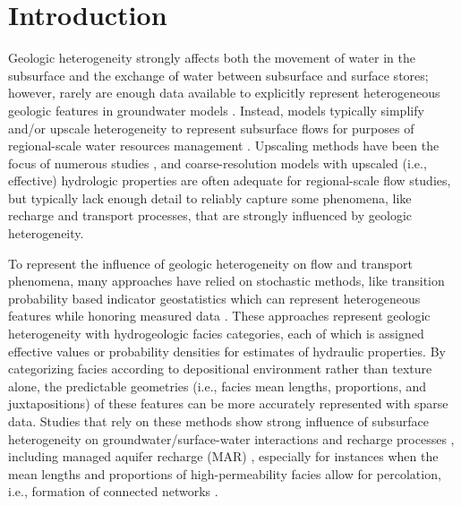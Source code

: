 \section{Introduction} \label{sec:intro} 


Geologic heterogeneity strongly affects both the movement of water in the subsurface and the exchange of water between subsurface and surface stores; however, rarely are enough data available to explicitly represent heterogeneous geologic features in groundwater models \citep{koltermann1996heterogeneity,deMarsily2005heterogeneity}. Instead, models typically simplify and/or upscale heterogeneity to represent subsurface flows for purposes of regional-scale water resources management \citep[e.g.,][]{fogg1986groundwater,phillips1991calibration}. Upscaling methods have been the focus of numerous studies \citep[e.g.,][]{renard1997calculating, fogg2000connected, neuman2003multifaceted, fleckenstein2008efficient}, and coarse-resolution models with upscaled (i.e., effective) hydrologic properties are often adequate for regional-scale flow studies, but typically lack enough detail to reliably capture some phenomena, like recharge and transport processes, that are strongly influenced by geologic heterogeneity. 

To represent the influence of geologic heterogeneity on flow and transport phenomena, many approaches have relied on stochastic methods, like transition probability based indicator geostatistics which can represent heterogeneous features while honoring measured data \citep{carle1996tprogs,weissmann1999multi,weissmann1999three}. These approaches represent geologic heterogeneity with hydrogeologic facies categories, each of which is assigned effective values or probability densities for estimates of hydraulic properties. By categorizing facies according to depositional environment rather than texture alone, the predictable geometries (i.e., facies mean lengths, proportions, and juxtapositions) of these features can be more accurately represented with sparse data. Studies that rely on these methods show strong influence of subsurface heterogeneity on groundwater/surface-water interactions and recharge processes \citep{LeeSiYong2004thesis,fleckenstein2006river,engdahl2010evaluation,liu2014thesis}, including managed aquifer recharge (MAR) \citep{maples_2019}, especially for instances when the mean lengths and proportions of high-permeability facies allow for percolation, i.e., formation of connected networks \citep{fogg2000connected,harter2005finite}.

